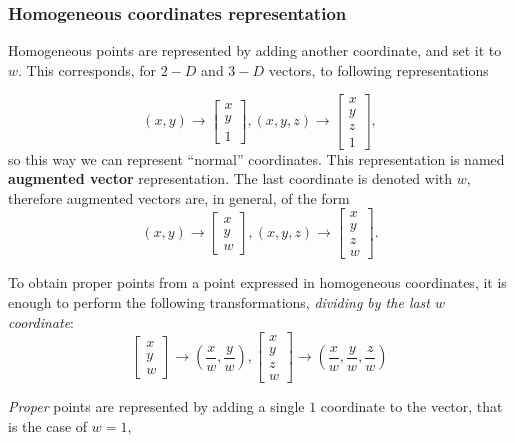 \documentclass[10pt]{report}
\begin{document}
\subsubsection{Homogeneous coordinates representation}
\label{sec:org643336e}
Homogeneous points are represented by adding another coordinate, and set
it to \(w\). This corresponds, for \(2-D\) and \(3-D\) vectors, to
following representations

\[(x, y) \rightarrow \begin{bmatrix} x \\ y \\ 1\end{bmatrix}, (x, y, z) \rightarrow \begin{bmatrix} x \\ y \\ z \\ 1\end{bmatrix},\] so this way we can represent ``normal'' coordinates.
This representation is named \textbf{augmented vector} representation. The last coordinate is denoted with \(w\), therefore augmented vectors are, in general, of the form
\[(x, y) \rightarrow \begin{bmatrix} x \\ y \\ w\end{bmatrix}, (x, y, z) \rightarrow \begin{bmatrix} x \\ y \\ z \\ w\end{bmatrix}.\]

To obtain proper points from a point expressed in homogeneous coordinates, it is enough to perform the following transformations, \emph{dividing by the last \(w\) coordinate}:
\[\begin{bmatrix} x \\ y \\ w\end{bmatrix} \rightarrow \left(\frac x w, \frac y w\right), \begin{bmatrix} x \\ y \\ z \\ w\end{bmatrix} \rightarrow \left(\frac x w, \frac y w, \frac z w\right)\]

\emph{Proper} points are represented by adding a single \(1\) coordinate to the
vector, that is the case of \(w = 1\),
\end{document}
